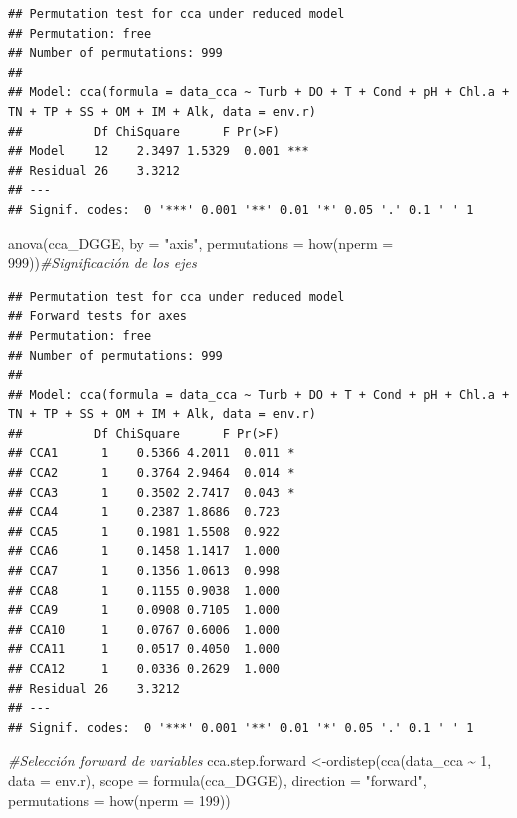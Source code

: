 \documentclass[
]{book}
\newenvironment{Shaded}{\begin{snugshade}}{\end{snugshade}}
\newcommand{\AttributeTok}[1]{\textcolor[rgb]{0.77,0.63,0.00}{#1}}
\newcommand{\CommentTok}[1]{\textcolor[rgb]{0.56,0.35,0.01}{\textit{#1}}}
\newcommand{\DecValTok}[1]{\textcolor[rgb]{0.00,0.00,0.81}{#1}}
\newcommand{\FunctionTok}[1]{\textcolor[rgb]{0.00,0.00,0.00}{#1}}
\newcommand{\NormalTok}[1]{#1}
\newcommand{\OtherTok}[1]{\textcolor[rgb]{0.56,0.35,0.01}{#1}}
\newcommand{\SpecialCharTok}[1]{\textcolor[rgb]{0.00,0.00,0.00}{#1}}
\newcommand{\StringTok}[1]{\textcolor[rgb]{0.31,0.60,0.02}{#1}}
\begin{document}
\begin{verbatim}
## Permutation test for cca under reduced model
## Permutation: free
## Number of permutations: 999
## 
## Model: cca(formula = data_cca ~ Turb + DO + T + Cond + pH + Chl.a + TN + TP + SS + OM + IM + Alk, data = env.r)
##          Df ChiSquare      F Pr(>F)    
## Model    12    2.3497 1.5329  0.001 ***
## Residual 26    3.3212                  
## ---
## Signif. codes:  0 '***' 0.001 '**' 0.01 '*' 0.05 '.' 0.1 ' ' 1
\end{verbatim}

\begin{Shaded}
\begin{Highlighting}[]
\FunctionTok{anova}\NormalTok{(cca\_DGGE, }\AttributeTok{by =} \StringTok{"axis"}\NormalTok{, }\AttributeTok{permutations =} \FunctionTok{how}\NormalTok{(}\AttributeTok{nperm =} \DecValTok{999}\NormalTok{))}\CommentTok{\#Significación de los ejes}
\end{Highlighting}
\end{Shaded}

\begin{verbatim}
## Permutation test for cca under reduced model
## Forward tests for axes
## Permutation: free
## Number of permutations: 999
## 
## Model: cca(formula = data_cca ~ Turb + DO + T + Cond + pH + Chl.a + TN + TP + SS + OM + IM + Alk, data = env.r)
##          Df ChiSquare      F Pr(>F)  
## CCA1      1    0.5366 4.2011  0.011 *
## CCA2      1    0.3764 2.9464  0.014 *
## CCA3      1    0.3502 2.7417  0.043 *
## CCA4      1    0.2387 1.8686  0.723  
## CCA5      1    0.1981 1.5508  0.922  
## CCA6      1    0.1458 1.1417  1.000  
## CCA7      1    0.1356 1.0613  0.998  
## CCA8      1    0.1155 0.9038  1.000  
## CCA9      1    0.0908 0.7105  1.000  
## CCA10     1    0.0767 0.6006  1.000  
## CCA11     1    0.0517 0.4050  1.000  
## CCA12     1    0.0336 0.2629  1.000  
## Residual 26    3.3212                
## ---
## Signif. codes:  0 '***' 0.001 '**' 0.01 '*' 0.05 '.' 0.1 ' ' 1
\end{verbatim}

\begin{Shaded}
\begin{Highlighting}[]
\CommentTok{\#Selección forward de variables}
\NormalTok{cca.step.forward }\OtherTok{\textless{}{-}}\FunctionTok{ordistep}\NormalTok{(}\FunctionTok{cca}\NormalTok{(data\_cca }\SpecialCharTok{\textasciitilde{}} \DecValTok{1}\NormalTok{, }\AttributeTok{data =}\NormalTok{ env.r), }\AttributeTok{scope =} \FunctionTok{formula}\NormalTok{(cca\_DGGE),}
\AttributeTok{direction =} \StringTok{"forward"}\NormalTok{, }\AttributeTok{permutations =} \FunctionTok{how}\NormalTok{(}\AttributeTok{nperm =} \DecValTok{199}\NormalTok{))}
\end{Highlighting}
\end{Shaded}
\end{document}
